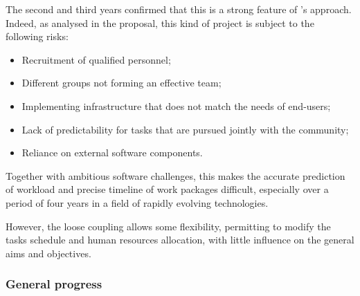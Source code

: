 The second and third years confirmed that this is a strong feature of \ODK's
approach. Indeed, as analysed in the proposal, this kind of project is
subject to the following risks:
\begin{itemize}
\item Recruitment of qualified personnel;
\item Different groups not forming an effective team;
\item Implementing infrastructure that does not match the needs of end-users;
\item Lack of predictability for tasks that are pursued jointly with
  the community;
\item Reliance on external software components.
\end{itemize}
Together with ambitious software challenges, this makes the accurate
prediction of workload and precise timeline of work packages
difficult, especially over a period of four years in a field of
rapidly evolving technologies.

However, the loose coupling allows some flexibility,
permitting to modify the tasks schedule and human resources allocation,
with little influence on the general aims and objectives.

\subsubsection*{General progress}

